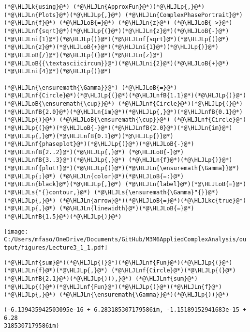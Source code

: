 \documentclass[12pt,a4paper]{article}
\newcommand{\HLJLk}[1]{\textcolor[RGB]{148,91,176}{\textbf{#1}}}
\newcommand{\HLJLkc}[1]{\textcolor[RGB]{59,151,46}{\textit{#1}}}
\newcommand{\HLJLn}[1]{#1}
\newcommand{\HLJLnf}[1]{\textcolor[RGB]{66,102,213}{#1}}
\newcommand{\HLJLs}[1]{\textcolor[RGB]{201,61,57}{#1}}
\newcommand{\HLJLnfB}[1]{\textcolor[RGB]{59,151,46}{#1}}
\newcommand{\HLJLni}[1]{\textcolor[RGB]{59,151,46}{#1}}
\newcommand{\HLJLoB}[1]{\textcolor[RGB]{102,102,102}{\textbf{#1}}}
\newcommand{\HLJLp}[1]{#1}
\begin{document}
\begin{lstlisting}
(*@\HLJLk{using}@*) (*@\HLJLn{ApproxFun}@*)(*@\HLJLp{,}@*) (*@\HLJLn{Plots}@*)(*@\HLJLp{,}@*) (*@\HLJLn{ComplexPhasePortrait}@*)
(*@\HLJLn{f}@*) (*@\HLJLoB{=}@*) (*@\HLJLn{z}@*) (*@\HLJLoB{->}@*) (*@\HLJLnf{sqrt}@*)(*@\HLJLp{(}@*)(*@\HLJLn{z}@*)(*@\HLJLoB{-}@*)(*@\HLJLni{1}@*)(*@\HLJLp{)}@*)(*@\HLJLnf{sqrt}@*)(*@\HLJLp{(}@*)(*@\HLJLn{z}@*)(*@\HLJLoB{+}@*)(*@\HLJLni{1}@*)(*@\HLJLp{)}@*)(*@\HLJLoB{/}@*)(*@\HLJLp{(}@*)(*@\HLJLn{z}@*)(*@\HLJLoB{{\textasciicircum}}@*)(*@\HLJLni{2}@*)(*@\HLJLoB{+}@*)(*@\HLJLni{4}@*)(*@\HLJLp{)}@*)

(*@\HLJLn{\ensuremath{\Gamma}}@*) (*@\HLJLoB{=}@*) (*@\HLJLnf{Circle}@*)(*@\HLJLp{(}@*)(*@\HLJLnfB{1.1}@*)(*@\HLJLp{)}@*) (*@\HLJLoB{\ensuremath{\cup}}@*) (*@\HLJLnf{Circle}@*)(*@\HLJLp{(}@*)(*@\HLJLnfB{2.0}@*)(*@\HLJLn{im}@*)(*@\HLJLp{,}@*)(*@\HLJLnfB{0.1}@*)(*@\HLJLp{)}@*) (*@\HLJLoB{\ensuremath{\cup}}@*) (*@\HLJLnf{Circle}@*)(*@\HLJLp{(}@*)(*@\HLJLoB{-}@*)(*@\HLJLnfB{2.0}@*)(*@\HLJLn{im}@*)(*@\HLJLp{,}@*)(*@\HLJLnfB{0.1}@*)(*@\HLJLp{)}@*)
(*@\HLJLnf{phaseplot}@*)(*@\HLJLp{(}@*)(*@\HLJLoB{-}@*)(*@\HLJLnfB{2..2}@*)(*@\HLJLp{,}@*) (*@\HLJLoB{-}@*)(*@\HLJLnfB{3..3}@*)(*@\HLJLp{,}@*) (*@\HLJLn{f}@*)(*@\HLJLp{)}@*)
(*@\HLJLnf{plot!}@*)(*@\HLJLp{(}@*)(*@\HLJLn{\ensuremath{\Gamma}}@*)(*@\HLJLp{;}@*) (*@\HLJLn{color}@*)(*@\HLJLoB{=:}@*)(*@\HLJLn{black}@*)(*@\HLJLp{,}@*) (*@\HLJLn{label}@*)(*@\HLJLoB{=}@*)(*@\HLJLs{"{}contour,}@*) (*@\HLJLs{\ensuremath{\Gamma}"{}}@*)(*@\HLJLp{,}@*) (*@\HLJLn{arrow}@*)(*@\HLJLoB{=}@*)(*@\HLJLkc{true}@*)(*@\HLJLp{,}@*) (*@\HLJLn{linewidth}@*)(*@\HLJLoB{=}@*)(*@\HLJLnfB{1.5}@*)(*@\HLJLp{)}@*)
\end{lstlisting}

\texttt{[image: C:/Users/mfaso/OneDrive/Documents/GitHub/M3M6AppliedComplexAnalysis/output/figures/Lecture3\_1\_1.pdf]}

\begin{lstlisting}
(*@\HLJLnf{sum}@*)(*@\HLJLp{(}@*)(*@\HLJLnf{Fun}@*)(*@\HLJLp{(}@*)(*@\HLJLn{f}@*)(*@\HLJLp{,}@*) (*@\HLJLnf{Circle}@*)(*@\HLJLp{(}@*)(*@\HLJLnfB{2.1}@*)(*@\HLJLp{))),}@*) (*@\HLJLnf{sum}@*)(*@\HLJLp{(}@*)(*@\HLJLnf{Fun}@*)(*@\HLJLp{(}@*)(*@\HLJLn{f}@*)(*@\HLJLp{,}@*) (*@\HLJLn{\ensuremath{\Gamma}}@*)(*@\HLJLp{))}@*)
\end{lstlisting}

\begin{lstlisting}
(-6.139435942503095e-16 + 6.283185307179586im, -1.15189152941683e-15 + 6.28
3185307179586im)
\end{lstlisting}
\end{document}

